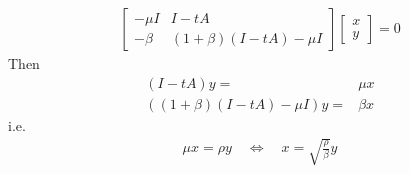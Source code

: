 \documentclass[english,12pt,a4paper]{article}
\begin{document}
%
%
\begin{align*}
\begin{bmatrix}
-\mu I  & I-tA\\
-\beta & (1+\beta)(I - tA)-\mu I
\end{bmatrix}
\begin{bmatrix}
x \\ y
\end{bmatrix}
=0
\end{align*}
%
Then
%
\begin{align*}
 (I-tA)y=&\mu x\\
((1+\beta)(I - tA)-\mu I)y =& \beta x
\end{align*}
%
i.e.
%
\begin{align*}
\mu x = \rho y \quad\Leftrightarrow\quad x = \sqrt{\frac{\rho}{\beta}}y
\end{align*}
%


%




%
\end{document}
